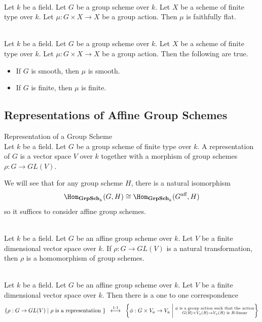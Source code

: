 \documentclass[a4paper]{article}
\begin{document}
\begin{lmm}{}{}\\
Let $k$ be a field. Let $G$ be a group scheme over $k$. Let $X$ be a scheme of finite type over $k$. Let $\mu:G\times X\to X$ be a group action. Then $\mu$ is faithfully flat. 
\end{lmm}

\begin{lmm}{}{}\\
Let $k$ be a field. Let $G$ be a group scheme over $k$. Let $X$ be a scheme of finite type over $k$. Let $\mu:G\times X\to X$ be a group action. Then the following are true. 
\begin{itemize}
\item If $G$ is smooth, then $\mu$ is smooth. 
\item If $G$ is finite, then $\mu$ is finite. 
\end{itemize}
\end{lmm}

\subsection{Representations of Affine Group Schemes}
\begin{defn}{Representation of a Group Scheme}{}\\
Let $k$ be a field. Let $G$ be a group scheme of finite type over $k$. A representation of $G$ is a vector space $V$ over $k$ together with a morphism of group schemes $\rho:G\to GL(V)$. 
\end{defn}

We will see that for any group scheme $H$, there is a natural isomorphism $$\Hom_{\bold{GrpSch}_k}(G,H)\cong\Hom_{\bold{GrpSch}_k}(G^\text{aff},H)$$ so it suffices to consider affine group schemes. 

\begin{lmm}{}{}\\
Let $k$ be a field. Let $G$ be an affine group scheme over $k$. Let $V$ be a finite dimensional vector space over $k$. If $\rho:G\to GL(V)$ is a natural transformation, then $\rho$ is a homomorphism of group schemes. 
\end{lmm}

\begin{lmm}{}{}\\
Let $k$ be a field. Let $G$ be an affine group scheme over $k$. Let $V$ be a finite dimensional vector space over $k$. Then there is a one to one correspondence $$\{\rho:G\to GL(V)\;|\;\rho\text{ is a representation }\}\;\;\overset{1:1}{\longleftrightarrow}\;\;\left\{\phi:G\times V_a\to V_a\;\bigg{|}\;\substack{\phi\text{ is a group action such that the action}\\G(R)\times V_a(R)\to V_a(R)\text{ is }R\text{-linear}}\right\}$$
\end{lmm}
\end{document}
